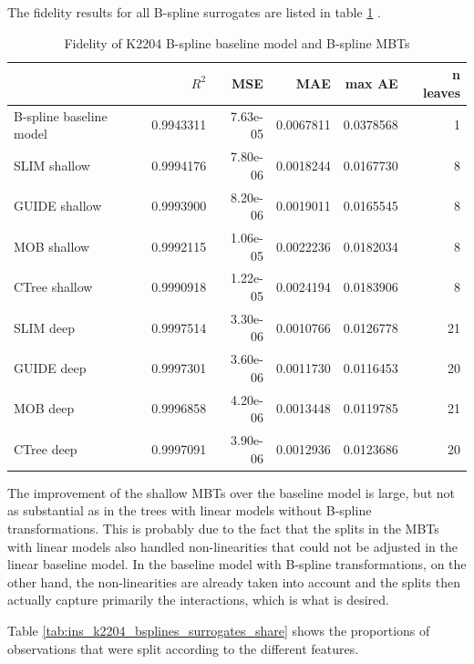 The fidelity results for all B-spline surrogates are listed in table \ref{tab:ins_k2204_bsplines_surrogates_perf} .

\begin{table}

\caption{Fidelity of K2204 B-spline baseline model and  B-spline MBTs}
\centering \small
\begin{tabular}[t]{l|r|r|r|r|r}
\hline
  & $R^2$ & MSE & MAE & max AE & n leaves\\
\hline
B-spline baseline model & 0.9943311 & 7.63e-05 & 0.0067811 & 0.0378568 & 1\\
\hline
SLIM shallow & 0.9994176 & 7.80e-06 & 0.0018244 & 0.0167730 & 8\\
GUIDE shallow & 0.9993900 & 8.20e-06 & 0.0019011 & 0.0165545 & 8\\
MOB shallow & 0.9992115 & 1.06e-05 & 0.0022236 & 0.0182034 & 8\\
CTree shallow & 0.9990918 & 1.22e-05 & 0.0024194 & 0.0183906 & 8\\
\hline
SLIM deep & 0.9997514 & 3.30e-06 & 0.0010766 & 0.0126778 & 21\\
GUIDE deep & 0.9997301 & 3.60e-06 & 0.0011730 & 0.0116453 & 20\\
MOB deep & 0.9996858 & 4.20e-06 & 0.0013448 & 0.0119785 & 21\\
CTree deep & 0.9997091 & 3.90e-06 & 0.0012936 & 0.0123686 & 20\\
\hline
\end{tabular}
\label{tab:ins_k2204_bsplines_surrogates_perf}
\end{table}


The improvement of the shallow MBTs over the baseline model is large, but not as substantial as in the trees with linear models without B-spline transformations. This is probably due to the fact that the splits in the MBTs with linear models also handled non-linearities that could not be adjusted in the linear baseline model. In the baseline model with B-spline transformations, on the other hand, the non-linearities are already taken into account and the splits then actually capture primarily the interactions, which is what is desired. 



Table \ref{tab:ins_k2204_bsplines_surrogates_share}  shows the proportions of observations that were split according to the different features. 


